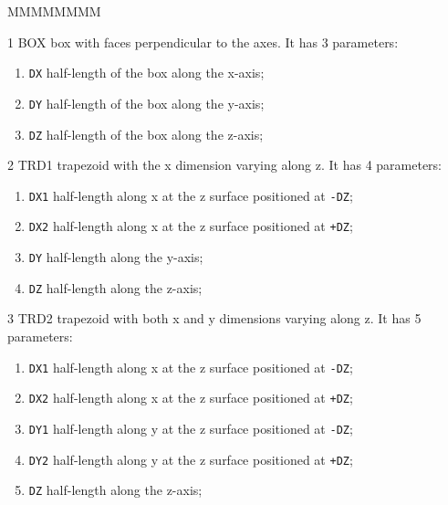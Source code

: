 \begin{DLtt}{MMMMMMMM}
\item[1  BOX] box with faces perpendicular to the
axes. It has 3 parameters:
\begin{enumerate}
\item {\tt DX} half-length of the box along the x-axis;
\item {\tt DY} half-length of the box along the y-axis;
\item {\tt DZ} half-length of the box along the z-axis;
\end{enumerate}
 
\item[2  TRD1] trapezoid with the x dimension varying along z. It has
4 parameters:
\begin{enumerate}
\item {\tt DX1} half-length along x at the z surface positioned
at {\tt -DZ};
\item {\tt DX2} half-length along x at the z surface positioned
at {\tt +DZ};
\item {\tt DY} half-length along the y-axis;
\item {\tt DZ} half-length along the z-axis;
\end{enumerate}
 
\item[3  TRD2] trapezoid with both x and y dimensions varying along z.
It has 5 parameters:
\begin{enumerate}
\item {\tt DX1} half-length along x at the z surface positioned
at {\tt -DZ};
\item {\tt DX2} half-length along x at the z surface positioned
at {\tt +DZ};
\item {\tt DY1} half-length along y at the z surface positioned
at {\tt -DZ};
\item {\tt DY2} half-length along y at the z surface positioned
at {\tt +DZ};
\item {\tt DZ} half-length along the z-axis;
\end{enumerate}


\end{DLtt}
